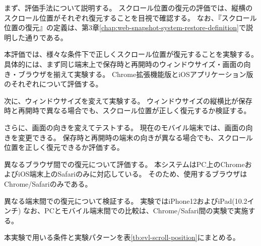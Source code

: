 まず、評価手法について説明する。
スクロール位置の復元の評価では、縦横のスクロール位置がそれぞれ復元することを目視で確認する。
なお、『スクロール位置の復元』の定義は、第3章\ref{chap:web-snapshot-system-restore-definition}で説明した通りである。

本評価では、様々な条件下で正しくスクロール位置が復元することを実験する。
具体的には、まず同じ端末上で保存時と再開時のウィンドウサイズ・画面の向き・ブラウザを揃えて実験する。
Chrome拡張機能版とiOSアプリケーション版のそれぞれについて評価する。

次に、ウィンドウサイズを変えて実験する。
ウィンドウサイズの縦横比が保存時と再開時で異なる場合でも、スクロール位置が正しく復元するか検証する。

さらに、画面の向きを変えてテストする。
現在のモバイル端末では、画面の向きを変更できる。
保存時と再開時の端末の向きが異なる場合でも、スクロール位置を正しく復元できるか評価する。

異なるブラウザ間での復元について評価する。
本システムはPC上のChromeおよびiOS端末上のSafariのみに対応している。
そのため、使用するブラウザはChrome/Safariのみである。

異なる端末間での復元について検証する。
実験ではiPhone12\cite{iphone12}およびiPad(10.2インチ)\cite{ipad}
なお、PCとモバイル端末間での比較は、Chrome/Safari間の実験で実施する。

本実験で用いる条件と実験パターンを表\ref{tb:evl-scroll-position}にまとめる。

